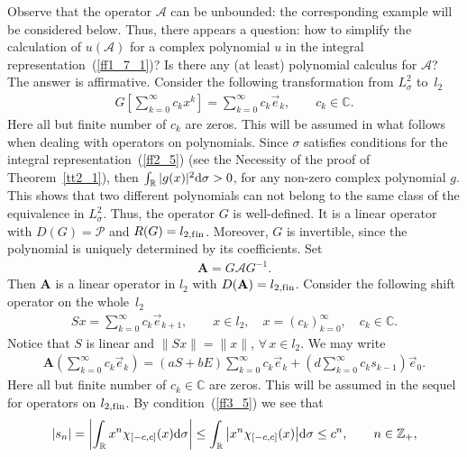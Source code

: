 \documentclass[pdftex]{sigma}
\numberwithin{equation}{section}
\begin{document}
Observe that the operator $\mathcal{A}$ can be unbounded: the corresponding example will be considered below. Thus, there appears a question: how to simplify the calculation of $u(\mathcal{A})$ for a complex polynomial $u$ in the integral representation~(\ref{ff1_7_1})? Is there any (at least) polynomial calculus for $\mathcal{A}$? The answer is af\/f\/irmative. Consider the following transformation from $L^2_\sigma$ to~$l_2$
\begin{gather*} G \left[ \sum_{k=0}^\infty c_k x^k \right] = \sum_{k=0}^\infty c_k \vec e_k,\qquad c_k\in\mathbb{C}. \end{gather*}
Here all but f\/inite number of $c_k$ are zeros. This will be assumed in what follows when dealing with operators on polynomials. Since $\sigma$ satisf\/ies conditions for the integral representation~(\ref{ff2_5}) (see the Necessity of the proof of Theorem~\ref{tt2_1}), then $\int_\mathbb{R} |g(x)|^2 {\rm d}\sigma > 0$, for any non-zero complex polynomial $g$. This shows that two dif\/ferent polynomials can not belong to the same class of the equivalence in $L^2_\sigma$. Thus, the operator $G$ is well-def\/ined. It is a linear operator with $D(G) = \mathcal{P}$ and $R(G) = l_{2,{\rm f\/in}}$. Moreover, $G$ is invertible, since the polynomial is uniquely determined by its coef\/f\/icients. Set
\begin{gather*} \mathbf{A} = G \mathcal{A} G^{-1}. \end{gather*}
Then $\mathbf{A}$ is a linear operator in $l_2$ with $D(\mathbf{A})=l_{2,{\rm f\/in}}$. Consider the following shift operator on the whole~$l_2$
\begin{gather*} S x = \sum_{k=0}^\infty c_k \vec e_{k+1},\qquad
x\in l_2,\quad x = (c_k)_{k=0}^\infty,\quad c_k\in\mathbb{C}. \end{gather*}
Notice that $S$ is linear and $\| Sx \| = \| x \|$, $\forall\, x\in l_2$. We may write
\begin{gather*} \mathbf{A} \left( \sum_{k=0}^\infty c_k \vec e_k \right) =
(a S + b E) \sum_{k=0}^\infty c_k \vec e_k + \left( d \sum_{k=0}^\infty c_k s_{k-1} \right) \vec e_0. \end{gather*}
Here all but f\/inite number of $c_k\in\mathbb{C}$ are zeros. This will be assumed in the sequel for operators on $l_{2,{\rm f\/in}}$. By condition~(\ref{ff3_5}) we see that
\begin{gather*} |s_n| = \left| \int_\mathbb{R} x^n \chi_{[-c,c]}(x) {\rm d}\sigma \right| \leq \int_\mathbb{R} \big| x^n \chi_{[-c,c]}(x) \big| {\rm d}\sigma
\leq c^n,\qquad n\in\mathbb{Z}_+, \end{gather*}
\end{document}
